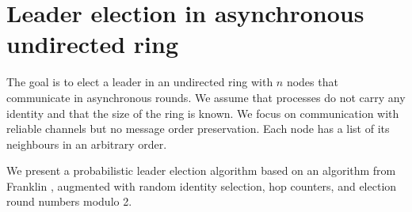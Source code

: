\documentclass[a4paper,12pt]{article}
\begin{document}
\section{Leader election in asynchronous undirected ring}
The goal is to elect a leader in an undirected ring with $n$ nodes that communicate in asynchronous rounds. We assume that processes do not carry any identity and that the size of the ring is known. We focus on communication with reliable channels but no message order preservation. Each node has a list of its neighbours in an arbitrary order.\par
We present a probabilistic leader election algorithm \cite{Bakhshi} based on an algorithm from Franklin \cite{10.1145/358506.358517}, augmented with random identity selection, hop counters, and election round numbers modulo 2.
\end{document}
